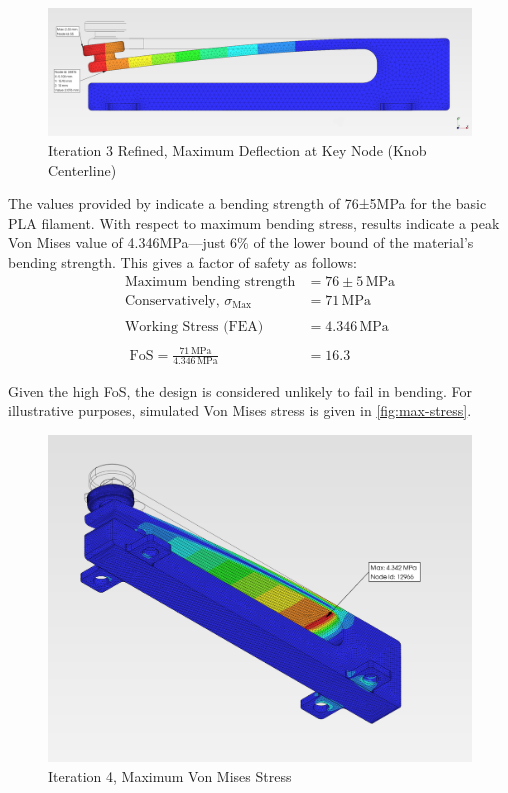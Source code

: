 \documentclass[10pt]{article}
\begin{document}
\begin{figure}[H]
	\centering
	\includegraphics[width=\textwidth]{./assets/15-max-deflection-node.png}
	\caption{Iteration 3 Refined, Maximum Deflection at Key Node (Knob Centerline)}
	\label{fig:max-deflection-node}
\end{figure}

The values provided by \cite{bambulab_pla2025} indicate a bending strength of 76±5MPa for the basic
PLA filament. With respect to maximum bending stress, results indicate a peak Von Mises value of
4.346MPa---just 6\% of the lower bound of the material's bending strength. This gives a factor of
safety as follows: %
\begin{align*}
	\text{Maximum bending strength}                        & = 76 \pm 5 \, \text{MPa} \\
	\text{Conservatively, } \sigma_{\text{Max}}            & =71 \, \text{MPa}        \\
	\\
	\text{Working Stress (FEA)}                            & = 4.346 \, \text{MPa}    \\
	\\
	\text{ FoS} = \frac{71\,\text{MPa}}{4.346\,\text{MPa}} & = 16.3
\end{align*}

Given the high FoS, the design is considered unlikely to fail in bending. For illustrative
purposes, simulated Von Mises stress is given in \autoref{fig:max-stress}.

\begin{figure}[H]
	\centering
	\includegraphics[width=\textwidth]{./assets/16-max-stress.png}
	\caption{Iteration 4, Maximum Von Mises Stress}
	\label{fig:max-stress}
\end{figure}
\end{document}
